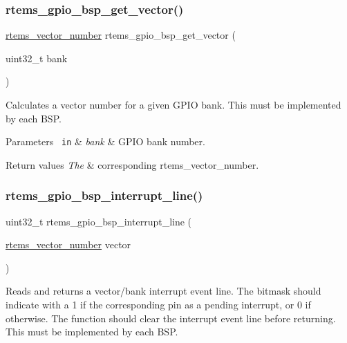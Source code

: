 \subsubsection{\texorpdfstring{rtems\_gpio\_bsp\_get\_vector()}{rtems\_gpio\_bsp\_get\_vector()}}
{\footnotesize\ttfamily \mbox{\hyperlink{group__ClassicINTR_ga3e434c197d99f128e78cae4d9358bd8b}{rtems\+\_\+vector\+\_\+number}} rtems\+\_\+gpio\+\_\+bsp\+\_\+get\+\_\+vector (\begin{DoxyParamCaption}\item[{uint32\+\_\+t}]{bank }\end{DoxyParamCaption})}



Calculates a vector number for a given G\+P\+IO bank. This must be implemented by each B\+SP. 


\begin{DoxyParams}[1]{Parameters}
\mbox{\texttt{ in}}  & {\em bank} & G\+P\+IO bank number.\\
\hline
\end{DoxyParams}

\begin{DoxyRetVals}{Return values}
{\em The} & corresponding rtems\+\_\+vector\+\_\+number. \\
\hline
\end{DoxyRetVals}
\mbox{\label{rpi-gpio_8c_ab709f5c3dfd804da18fbb9a9a40182a0}} 
\subsubsection{\texorpdfstring{rtems\_gpio\_bsp\_interrupt\_line()}{rtems\_gpio\_bsp\_interrupt\_line()}}
{\footnotesize\ttfamily uint32\+\_\+t rtems\+\_\+gpio\+\_\+bsp\+\_\+interrupt\+\_\+line (\begin{DoxyParamCaption}\item[{\mbox{\hyperlink{group__ClassicINTR_ga3e434c197d99f128e78cae4d9358bd8b}{rtems\+\_\+vector\+\_\+number}}}]{vector }\end{DoxyParamCaption})}



Reads and returns a vector/bank interrupt event line. The bitmask should indicate with a 1 if the corresponding pin as a pending interrupt, or 0 if otherwise. The function should clear the interrupt event line before returning. This must be implemented by each B\+SP. 


